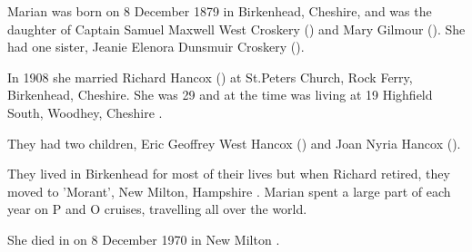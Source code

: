 
Marian was born on 8 December 1879 in  Birkenhead, Cheshire,  and was the daughter of Captain Samuel Maxwell West Croskery () and Mary Gilmour (). She had one sister, Jeanie Elenora Dunsmuir Croskery ().

In 1908 she married Richard Hancox () at St.Peters Church, Rock Ferry, Birkenhead, Cheshire. She was 29 and at the time was living at 19 Highfield South, Woodhey, Cheshire \cite{MarianCroskeryMarriage}.

They had two children, Eric Geoffrey West Hancox () and Joan Nyria Hancox ().

They lived in Birkenhead for most of their lives but when Richard retired, they moved to  'Morant', New Milton, Hampshire \cite{MarianCroskeryResidence}.  Marian spent a large part of each year on P and O cruises, travelling all over the world.

She died in on 8 December 1970 in New Milton \cite{MarianCroskeryDeath}.

